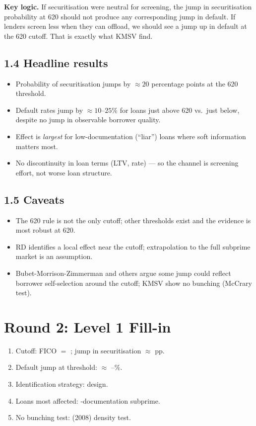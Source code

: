 \documentclass[11pt]{article}
\newcommand{\blank}[1]{\underline{\hspace{#1}}}
\begin{document}
\begin{keybox}
\textbf{Key logic.} If securitisation were neutral for screening, the jump in securitisation probability at 620 should not produce any corresponding jump in default. If lenders screen less when they can offload, we should see a jump up in default at the 620 cutoff. That is exactly what KMSV find.
\end{keybox}

\subsection*{1.4 Headline results}
\begin{itemize}
\item Probability of securitisation jumps by $\approx 20$ percentage points at the 620 threshold.
\item Default rates jump by $\approx 10$--$25\%$ for loans just above 620 vs.\ just below, despite no jump in observable borrower quality.
\item Effect is \emph{largest} for low-documentation (``liar'') loans where soft information matters most.
\item No discontinuity in loan terms (LTV, rate) --- so the channel is screening effort, not worse loan structure.
\end{itemize}

\subsection*{1.5 Caveats}
\begin{alertbox}
\begin{itemize}
\item The 620 rule is not the only cutoff; other thresholds exist and the evidence is most robust at 620.
\item RD identifies a local effect near the cutoff; extrapolation to the full subprime market is an assumption.
\item Bubet-Morrison-Zimmerman and others argue some jump could reflect borrower self-selection around the cutoff; KMSV show no bunching (McCrary test).
\end{itemize}
\end{alertbox}

\section*{Round 2: Level 1 Fill-in}
\begin{enumerate}
\item Cutoff: FICO $=$ \blank{1cm}; jump in securitisation $\approx$ \blank{1cm} pp.
\item Default jump at threshold: $\approx$ \blank{1cm}--\blank{1cm}\%.
\item Identification strategy: \blank{2cm} design.
\item Loans most affected: \blank{2cm}-documentation subprime.
\item No bunching test: \blank{2cm} (2008) density test.
\end{enumerate}
\end{document}
